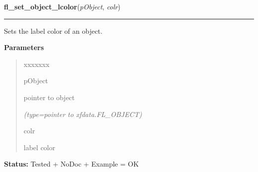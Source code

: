 \hspace{.8\funcindent}\begin{boxedminipage}{\funcwidth}

    \raggedright \textbf{fl\_set\_object\_lcolor}(\textit{pObject}, \textit{colr})

    \vspace{-1.5ex}

    \rule{\textwidth}{0.5\fboxrule}
\setlength{\parskip}{2ex}
    Sets the label color of an object.

\setlength{\parskip}{1ex}
      \textbf{Parameters}
      \vspace{-1ex}

      \begin{quote}
        \begin{Ventry}{xxxxxxx}

          \item[pObject]

          pointer to object

            {\it (type=pointer to xfdata.FL\_OBJECT)}

          \item[colr]

          label color

        \end{Ventry}

      \end{quote}

\textbf{Status:} Tested + NoDoc + Example = OK



    \end{boxedminipage}

    \label{xformslib:library:fl_get_object_lcol}

    \vspace{0.5ex}

